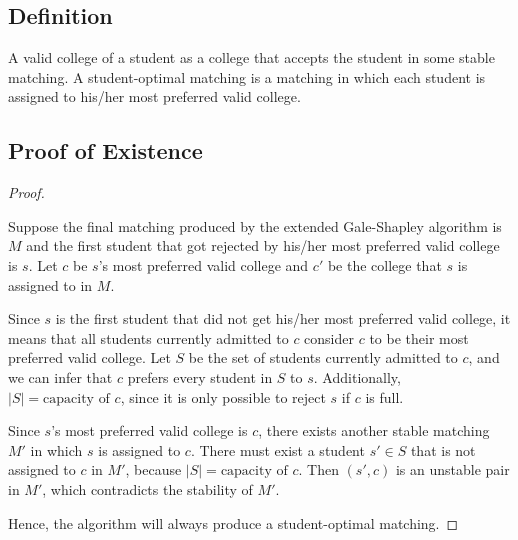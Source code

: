 \documentclass[a4paper,12pt]{article}
\begin{document}
\subsection*{Definition}

A valid college of a student as a college that accepts the student in some stable matching.
A student-optimal matching is a matching in which each student is assigned to his/her most preferred valid college.

\subsection*{Proof of Existence}

\begin{proof}
$ $

Suppose the final matching produced by the extended Gale-Shapley algorithm is $M$ and the first student that got rejected by his/her most preferred valid college is $s$.
Let $c$ be $s$'s most preferred valid college and $c'$ be the college that $s$ is assigned to in $M$.

Since $s$ is the first student that did not get his/her most preferred valid college, it means that all students currently admitted to $c$ consider $c$ to be their most preferred valid college.
Let $S$ be the set of students currently admitted to $c$, and we can infer that $c$ prefers every student in $S$ to $s$.
Additionally, $|S| = \text{capacity of } c$, since it is only possible to reject $s$ if $c$ is full.

Since $s$'s most preferred valid college is $c$, there exists another stable matching $M'$ in which $s$ is assigned to $c$.
There must exist a student $s' \in S$ that is not assigned to $c$ in $M'$, because $|S| = \text{capacity of } c$.
Then $(s', c)$ is an unstable pair in $M'$, which contradicts the stability of $M'$.

Hence, the algorithm will always produce a student-optimal matching.
\end{proof}
\end{document}
